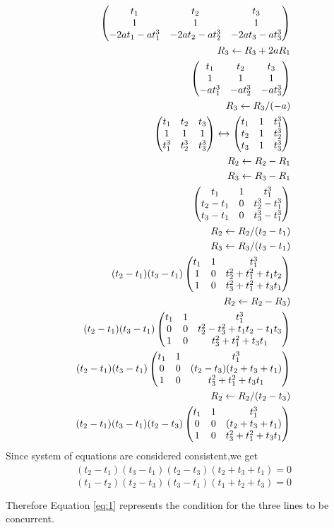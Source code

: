 \documentclass[journal,12pt,twocolumn]{IEEEtran}
\begin{document}
\begin{align}
\begin{split}
\begin{pmatrix}t_1&t_2&t_3\\1&1&1\\-2at_1-at_1^3&-2at_2-at_2^3&-2at_3-at_3^3
\end{pmatrix}\\
R_3\leftarrow {R_3+2aR_1}\\  
\begin{pmatrix}t_1&t_2&t_3\\1&1&1\\-at_1^3&-at_2^3&-at_3^3\end{pmatrix}\\
R_3 \leftarrow {R_3/(-a)}\\
\begin{pmatrix}t_1&t_2&t_3\\1&1&1\\t_1^3&t_2^3&t_3^3\end{pmatrix} \xleftrightarrow[]{}
\begin{pmatrix}t_1&1&t_1^3\\t_2&1&t_2^3\\t_3&1&t_3^3\end{pmatrix}\\
R_2 \leftarrow {R_2-R_1} \\ R_3 \leftarrow {R_3-R_1} \\
\begin{pmatrix}t_1&1&t_1^3\\t_2-t_1&0&t_2^3-t_1^3\\t_3-t_1&0&t_3^3-t_1^3\end{pmatrix}\\
R_2 \leftarrow {R_2/(t_2-t_1)}\\R_3 \leftarrow {R_3/(t_3-t_1)}\\
(t_2-t_1)(t_3-t_1)\begin{pmatrix}t_1&1&t_1^3\\1&0&t_2^2+t_1^2+t_1t_2\\1&0&t_3^2+t_1^2+t_3t_1\end{pmatrix}\\
R_2 \leftarrow {R_2-R_3)}\\
(t_2-t_1)(t_3-t_1)\begin{pmatrix}t_1&1&t_1^3\\0&0&t_2^2-t_3^2+t_1t_2-t_1t_3\\1&0&t_3^2+t_1^2+t_3t_1\end{pmatrix}\\
(t_2-t_1)(t_3-t_1)\begin{pmatrix}t_1&1&t_1^3\\0&0&(t_2-t_3)(t_2+t_3+t_1)\\1&0&t_3^2+t_1^2+t_3t_1\end{pmatrix}\\
R_2 \leftarrow {R_2/(t_2-t_3)}\\
(t_2-t_1)(t_3-t_1)(t_2-t_3)\begin{pmatrix}t_1&1&t_1^3\\0&0&(t_2+t_3+t_1)\\1&0&t_3^2+t_1^2+t_3t_1\end{pmatrix}\\
\end{split}
\end{align}
Since system of equations are considered consistent,we get
\begin{equation}
\begin{split}
(t_2-t_1)(t_3-t_1)(t_2-t_3)(t_2+t_3+t_1)=0
\end{split}
\end{equation}
\begin{equation}
(t_1-t_2)(t_2-t_3)(t_3-t_1)(t_1+t_2+t_3)=0
\label{eq:1}
\end{equation}

Therefore Equation \eqref{eq:1} represents the condition for the three lines to be concurrent.
\end{document}
